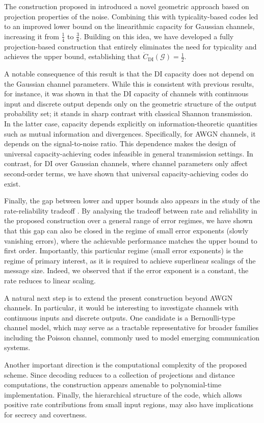 \documentclass[10pt,conference]{IEEEtran}
\newcommand{\1}{\mathds{1}}
\newcommand{\cG}{\mathcal{G}}
\begin{document}
The construction proposed in \cite{galaxy-codes} introduced a novel geometric approach based on projection properties of the noise. Combining this with typicality-based codes led to an improved lower bound on the linearithmic capacity for Gaussian channels, increasing it from $\frac{1}{4}$ to $\frac{3}{8}$. Building on this idea, we have developed a fully projection-based construction that entirely eliminates the need for typicality and achieves the upper bound, establishing that $\dot C_{\text{DI}}(\cG) = \frac{1}{2}$.

A notable consequence of this result is that the DI capacity does not depend on the Gaussian channel parameters. While this is consistent with previous results, for instance, it was shown in \cite{CDBW:DI_classical} that the DI capacity of channels with continuous input and discrete output depends only on the geometric structure of the output probability set; it stands in sharp contrast with classical Shannon transmission. In the latter case, capacity depends explicitly on information-theoretic quantities such as mutual information and divergences. Specifically, for AWGN channels, it depends on the signal-to-noise ratio. This dependence makes the design of universal capacity-achieving codes infeasible in general transmission settings. In contrast, for DI over Gaussian channels, where channel parameters only affect second-order terms, we have shown that universal capacity-achieving codes do exist.

Finally, the gap between lower and upper bounds also appears in the study of the rate-reliability tradeoff \cite{CDBW:Reliability-TCOM, RRGauss-arXiv}. By analysing the tradeoff between rate and reliability in the proposed construction over a general range of error regimes, we have shown that this gap can also be closed in the regime of small error exponents (slowly vanishing errors), where the achievable performance matches the upper bound to first order. Importantly, this particular regime (small error exponents) is the regime of primary interest, as it is required to achieve superlinear scalings of the message size. Indeed, we observed that if the error exponent is a constant, the rate reduces to linear scaling.

A natural next step is to extend the present construction beyond AWGN channels. In particular, it would be interesting to investigate channels with continuous inputs and discrete outputs. One candidate is a Bernoulli-type channel model, which may serve as a tractable representative for broader families including the Poisson channel, commonly used to model emerging communication systems.

Another important direction is the computational complexity of the proposed scheme. Since decoding reduces to a collection of projections and distance computations, the construction appears amenable to polynomial-time implementation. Finally, the hierarchical structure of the code, which allows positive rate contributions from small input regions, may also have implications for secrecy and covertness.











\end{document}
